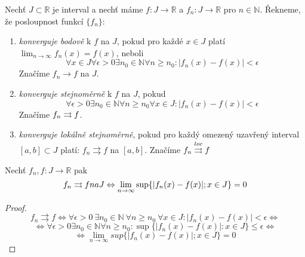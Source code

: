 \begin{definice}
Nechť $J \subset \mathbb{R}$ je interval a nechť máme $f : J \rightarrow \mathbb{R}$ a $f_n : J \rightarrow \mathbb{R}$ pro $n \in \mathbb{N}$. Řekneme, že posloupnost funkcí $\{f_n\}$:

\begin{enumerate}
\item \emph{konverguje bodově} k $f$ na $J$, pokud pro každé $x \in J$ platí $\lim_{n \rightarrow \infty} f_n(x) = f(x)$, neboli
$$\forall x \in J \forall \epsilon > 0 \exists n_0 \in \mathbb{N} \forall n \geq n_0 : |f_n(x) - f(x)| < \epsilon$$
Značíme $f_n \rightarrow f$ na $J$.
\item \emph{konverguje stejnoměrně} k $f$ na $J$, pokud
$$\forall \epsilon > 0 \exists n_0 \in \mathbb{N} \forall n \geq n_0 \forall x \in J : | f_n(x) - f(x) | < \epsilon$$
Značíme $f_n \rightrightarrows f$.
\item \emph{konverguje lokálně stejnoměrně}, pokud pro každý omezený uzavřený interval $[a, b] \subset J$ platí: $f_n \rightrightarrows f$ na $[a, b]$. Značíme $f_n \overset{loc}{\rightrightarrows} f$
\end{enumerate}
\end{definice}

\begin{vetal}
Nechť $f_n, f:J \rightarrow \mathbb{R}$ pak
$$f_n \rightrightarrows f na J \Leftrightarrow \lim_{n \rightarrow \infty} \sup \{ |f_n(x) - f(x)|; x \in J \} = 0$$
\end{vetal}
\begin{proof}
$$ f_n \rightrightarrows f \Leftrightarrow \forall \epsilon > 0 \  \exists n_0 \in \mathbb{N} \  \forall n \geq n_0 \  \forall x \in J: |f_n(x) - f(x)| < \epsilon \Leftrightarrow$$
$$\Leftrightarrow \forall \epsilon > 0 \exists n_0 \in \mathbb{N} \forall n \geq n_0 : \sup \{ |f_n(x) - f(x) | : x \in J \} \leq \epsilon \Leftrightarrow$$
$$\Leftrightarrow \lim_{n \to \infty} sup\{|f_n(x)-f(x)|;x \in J\} = 0$$
\end{proof}

